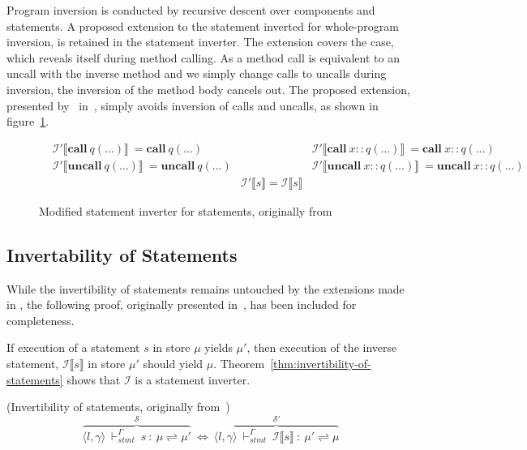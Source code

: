 Program inversion is conducted by recursive descent over components and statements. A proposed extension to the statement inverted for whole-program inversion, is retained in the \rooplpp statement inverter. The extension covers the case, which reveals itself during method calling. As a method call is equivalent to an uncall with the inverse method and we simply change calls to uncalls during inversion, the inversion of the method body cancels out. The proposed extension, presented by~\citeauthor{th:roopl} in~\cite{th:roopl}, simply avoids inversion of calls and uncalls, as shown in figure~\ref{fig:inverter-extension}.

\begin{figure}[ht]    
    \centering
    \begin{align*}
        &\mathcal{I}' \llbracket \textbf{call}\ q(\dots) \rrbracket\ = \textbf{call}\ q(\dots) &&\mathcal{I}' \llbracket \textbf{call}\ x::q(\dots) \rrbracket\ = \textbf{call}\ x::q(\dots)\\
        &\mathcal{I}' \llbracket \textbf{uncall}\ q(\dots) \rrbracket\ = \textbf{uncall}\ q(\dots) &&\mathcal{I}' \llbracket \textbf{uncall}\ x::q(\dots) \rrbracket\ = \textbf{uncall}\ x::q(\dots)\\ 
        &&\mathcal{I}' \llbracket s \rrbracket = \mathcal{I} \llbracket s \rrbracket
    \end{align*}
    \caption{Modified statement inverter for statements, originally from~\cite{th:roopl}}
    \label{fig:inverter-extension} 
\end{figure}

\subsection{Invertability of Statements}
\label{subsec:invertability-of-statements}
While the invertibility of statements remains untouched by the extensions made in \rooplpp, the following proof, originally presented in~\cite{th:roopl}, has been included for completeness.

If execution of a statement $s$ in store $\mu$ yields $\mu'$, then execution of the inverse statement, $\mathcal{I} \llbracket s \rrbracket$ in store $\mu'$ should yield $\mu$. Theorem~\ref{thm:invertibility-of-statements} shows that $\mathcal{I}$ is a statement inverter.\\

\begin{theorem}\label{thm:invertibility-of-statements}(Invertibility of statements, originally from~\cite{th:roopl})
    \begin{equation*}
        \overbrace{\langle l, \gamma \rangle\ \vdash_{stmt}^\Gamma\ s\ :\ \mu \rightleftharpoons \mu'}^{\mathcal{S}}\ \Longleftrightarrow\ \overbrace{\langle l, \gamma \rangle\ \vdash_{stmt}^\Gamma\ \mathcal{I}\llbracket s\rrbracket\ :\ \mu' \rightleftharpoons \mu}^{\mathcal{S}'}
    \end{equation*}
\end{theorem}


